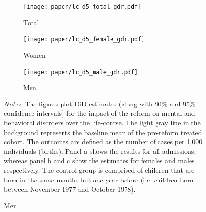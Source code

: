 \documentclass[11pt, a4paper, draft]{article} %
\begin{document}
\begin{landscape}
	\vspace*{\fill}
	\begin{figure}[H]\centering
		\caption{Life-course approach for \textbf{mental and behavioral disorders}}\label{fig: lc_d5_frg_DD}
		\begin{subfigure}[h]{0.31\linewidth}\centering\caption{Total}
			\texttt{[image: paper/lc\_d5\_total\_gdr.pdf]}
		\end{subfigure}
		\begin{subfigure}[h]{0.31\linewidth}\centering\caption{Women}
			\texttt{[image: paper/lc\_d5\_female\_gdr.pdf]}
		\end{subfigure}
		\quad
		\begin{subfigure}[h]{0.31\linewidth}\centering\caption{Men}
			\texttt{[image: paper/lc\_d5\_male\_gdr.pdf]}
		\end{subfigure}
		\scriptsize
		\begin{minipage}{\linewidth}
			\emph{Notes:} The figures plot DiD estimates (along with 90\% and 95\% confidence intervals) for the impact of the reform on mental and behavioral disorders over the life-course. The light gray line in the background represents the baseline mean of the pre-reform treated cohort. The outcomes are defined as the number of cases per 1,000 individuals (births). Panel a shows the results for all admissions, whereas panel b and c show the estimates for females and males respectively. The control group is comprised of children	that are born in the same months but one year before (i.e. children born between November 1977 and October 1978).
		\end{minipage}
	\end{figure}
	\vspace*{\fill}\clearpage
\end{landscape}

%
\end{document}
